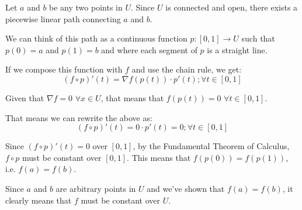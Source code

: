 \documentclass{article}
\newcommand{\sskip}{\newpage
}
\begin{document}
Let $a$ and $b$ be any two points in $U$. Since $U$ is connected and open,
there exists a piecewise linear path connecting $a$ and $b$.

We can think of this path as a continuous function $p : [0, 1] \to U$
such that $p(0) = a$ and $p(1) = b$ and where each segment of $p$
is a straight line.

If we compose this function with $f$ and use the chain rule,
we get:
\[(f \circ p)'(t) = \nabla f(p(t)) \cdot p'(t); \forall t \in [0, 1]\]

Given that $\nabla f = 0$ $\forall x \in U$, that means that
$f(p(t)) = 0$ $\forall t \in [0, 1]$.

That means we can rewrite the above as:
\[(f \circ p)'(t) = 0 \cdot p'(t) = 0; \forall t \in [0, 1]\]

Since $(f \circ p)'(t) = 0$ over $[0, 1]$, by the Fundamental Theorem of
Calculus, $f \circ p$ must be constant over $[0, 1]$.
This means that $f(p(0)) = f(p(1))$, i.e. $f(a) = f(b)$.

Since $a$ and $b$ are arbitrary points in $U$ and we've shown that
$f(a) = f(b)$, it clearly means that $f$ must be constant over $U$.

\sskip
\end{document}
